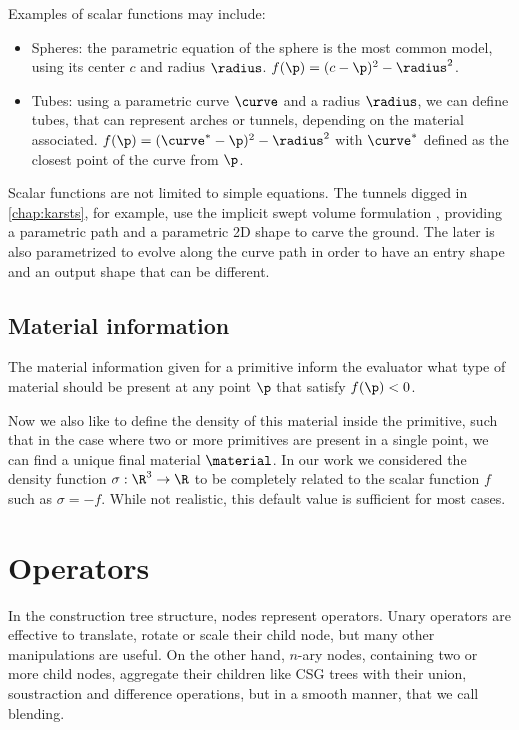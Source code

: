 Examples of scalar functions may include:
\begin{itemize}
    \item Spheres: the parametric equation of the sphere is the most common model, using its center $c$ and radius $\radius$. $f(\p) = (c - \p)^2 - \radius^2$.
    \item Tubes: using a parametric curve $\curve$ and a radius $\radius$, we can define tubes, that can represent arches or tunnels, depending on the material associated. $f(\p) = (\curve^* - \p)^2 - \radius^2$ with $\curve^*$ defined as the closest point of the curve from $\p$.
\end{itemize}

Scalar functions are not limited to simple equations. The tunnels digged in \cref{chap:karsts}, for example, use the implicit swept volume formulation \cite{Schroeder1994}, providing a parametric path and a parametric 2D shape to carve the ground. The later is also parametrized to evolve along the curve path in order to have an entry shape and an output shape that can be different.

\subsection{Material information}
The material information given for a primitive inform the evaluator what type of material should be present at any point $\p$ that satisfy $f(\p) < 0$.

Now we also like to define the density of this material inside the primitive, such that in the case where two or more primitives are present in a single point, we can find a unique final material $\material$. In our work we considered the density function $\sigma: \R^3 \to \R$ to be completely related to the scalar function $f$ such as $\sigma = -f$. While not realistic, this default value is sufficient for most cases.

\section{Operators}
In the construction tree structure, nodes represent operators. Unary operators are effective to translate, rotate or scale their child node, but many other manipulations are useful. On the other hand, $n$-ary nodes, containing two or more child nodes, aggregate their children like CSG trees with their union, soustraction and difference operations, but in a smooth manner, that we call blending.


